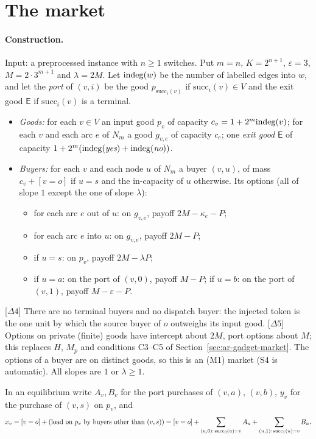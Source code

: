 \section{The market}\label{sec:sh-market}

\paragraph{Construction.} Input: a preprocessed instance with $n\ge1$ switches. Put $m=n$,
$K=2^{n+1}$, $\varepsilon=3$, $M=2\cdot3^{m+1}$ and $\lambda=2M$. Let $\mathrm{indeg}(w)$ be the number of
labelled edges into $w$, and let the \emph{port} of $(v,i)$ be the good $p_{\mathrm{succ}_i(v)}$ if
$\mathrm{succ}_i(v)\in V$ and the exit good $\mathsf E$ if $\mathrm{succ}_i(v)$ is a terminal.
\begin{itemize}[nosep]
\item \emph{Goods:} for each $v\in V$ an input good $p_v$ of capacity $c_v=1+2^m\mathrm{indeg}(v)$; for each
$v$ and each arc $e$ of $N_m$ a good $g_{v,e}$ of capacity $c_e$; one \emph{exit good} $\mathsf E$ of
capacity $1+2^m(\mathrm{indeg}(\textit{yes})+\mathrm{indeg}(\textit{no}))$.
\item \emph{Buyers:} for each $v$ and each node $u$ of $N_m$ a buyer $(v,u)$, of mass $c_v+[v=o]$ if
$u=s$ and the in-capacity of $u$ otherwise. Its options (all of slope $1$ except the one of slope
$\lambda$):
\begin{itemize}[nosep]
\item for each arc $e$ out of $u$: on $g_{v,e}$, payoff $2M-\kappa_e-P$;
\item for each arc $e$ into $u$: on $g_{v,e}$, payoff $2M-P$;
\item if $u=s$: on $p_v$, payoff $2M-\lambda P$;
\item if $u=a$: on the port of $(v,0)$, payoff $M-P$; if $u=b$: on the port of $(v,1)$, payoff
$M-\varepsilon-P$.
\end{itemize}
\end{itemize}

[$\Delta4$] There are no terminal buyers and no dispatch buyer: the injected token is the one unit by
which the source buyer of $o$ outweighs its input good. [$\Delta5$] Options on private (finite) goods
have intercept about $2M$, port options about $M$; this replaces $H$, $M_p$ and conditions C3--C5 of
Section~\ref{sec:ar-gadget-market}. The options of a buyer are on distinct goods, so this is an (M1)
market (S4 is automatic). All slopes are $1$ or $\lambda\ge1$.

In an equilibrium write $A_v,B_v$ for the port purchases of $(v,a)$, $(v,b)$, $y_v$ for the purchase of
$(v,s)$ on $p_v$, and
\[
x_v=[v=o]+(\text{load on }p_v\text{ by buyers other than }(v,s))
=[v=o]+\sum_{(u,0):\,\mathrm{succ}_0(u)=v}A_u+\sum_{(u,1):\,\mathrm{succ}_1(u)=v}B_u .
\]

